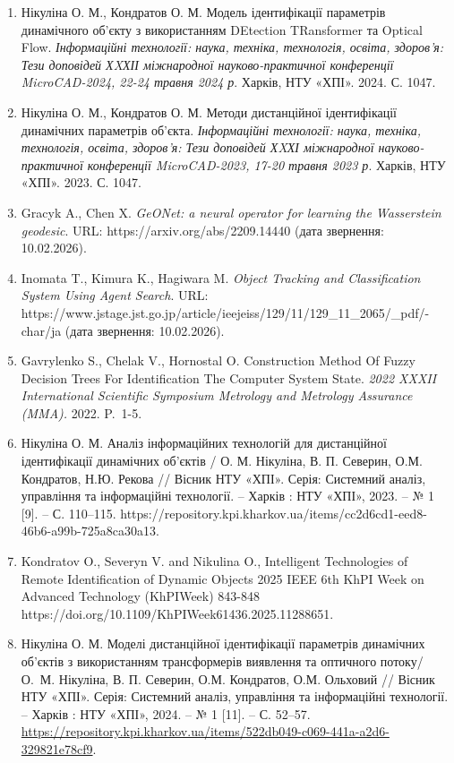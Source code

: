 \documentclass[
]{article}
\begin{document}
\begin{enumerate}
\item
  Нікуліна О. М., Кондратов О. М. Модель ідентифікації параметрів динамічного об'єкту з використанням DEtection TRansformer та Optical Flow. \emph{Інформаційні технології: наука, техніка, технологія, освіта, здоров'я: Тези доповідей ХXХІІ міжнародної науково-практичної конференції MicroCAD-2024, 22-24 травня 2024 р}. Харків, НТУ «ХПІ». 2024. С. 1047.
\item
  Нікуліна О. М., Кондратов О. М. Методи дистанційної ідентифікації динамічних параметрів об'єкта. \emph{Інформаційні технології: наука, техніка, технологія, освіта, здоров'я: Тези доповідей ХXХІ міжнародної науково-практичної конференції MicroCAD-2023, 17-20 травня 2023 р}. Харків, НТУ «ХПІ». 2023. С. 1047.
\item
  Gracyk A., Chen X. \emph{GeONet: a neural operator for learning the Wasserstein geodesic}. URL: https://arxiv.org/abs/2209.14440 (дата звернення: 10.02.2026).
\item
  Inomata T., Kimura K., Hagiwara M. \emph{Object Tracking and Classification System Using Agent Search}. URL: https://www.jstage.jst.go.jp/article/ieejeiss/129/11/129\_11\_2065/\_pdf/-char/ja (дата звернення: 10.02.2026).
\item
  \protect{}\label{_Ref221384139}{}Gavrylenko S., Chelak V., Hornostal O. Construction Method Of Fuzzy Decision Trees For Identification The Computer System State. \emph{2022 XXXII International Scientific Symposium Metrology and Metrology Assurance (MMA).} 2022. P.~1-5.
\item
  \protect{}\label{_Ref221290074}{}Нікуліна О. М. Аналіз інформаційних технологій для дистанційної ідентифікації динамічних об'єктів / О. М. Нікуліна, В. П. Северин, О.М. Кондратов, Н.Ю. Рекова // Вісник НТУ «ХПІ». Серія: Системний аналіз, управління та інформаційні технології. -- Харків : НТУ «ХПІ», 2023. -- № 1 {[}9{]}. -- С. 110--115. https://repository.kpi.kharkov.ua/items/cc2d6cd1-eed8-46b6-a99b-725a8ca30a13.
\item
  Kondratov O., Severyn V. and Nikulina O., Intelligent Technologies of Remote Identification of Dynamic Objects 2025 IEEE 6th KhPI Week on Advanced Technology (KhPIWeek) 843-848 https://doi.org/10.1109/KhPIWeek61436.2025.11288651.
\item
  Нікуліна О. М. Моделі дистанційної ідентифікації параметрів динамічних об'єктів з використанням трансформерів виявлення та оптичного потоку/ О.~М. Нікуліна, В. П. Северин, О.М. Кондратов, О.М. Ольховий // Вісник НТУ «ХПІ». Серія: Системний аналіз, управління та інформаційні технології. -- Харків : НТУ «ХПІ», 2024. -- № 1 {[}11{]}. -- С. 52--57. \url{https://repository.kpi.kharkov.ua/items/522db049-c069-441a-a2d6-329821e78cf9}.

\end{enumerate}
\end{document}
